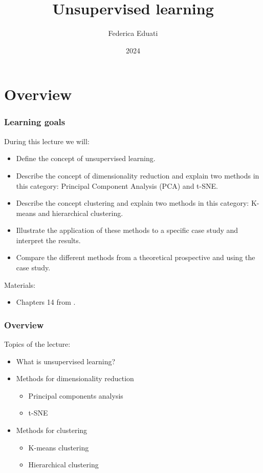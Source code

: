 \documentclass[notes]{beamer}          %
\title{Unsupervised learning}
\author{Federica Eduati}
\institute{Eindhoven University of Technology

Department of Biomedical Engineering}
\date{2024}
\begin{document}
 
\frame{\titlepage}
 
\section{Overview}

\begin{frame}
\frametitle{Learning goals}
During this lecture we will:
\begin{itemize}
    \item Define the concept of unsupervised learning.
    \item Describe the concept of dimensionality reduction and explain two methods in this category: Principal Component Analysis (PCA) and t-SNE.
    \item Describe the concept clustering and explain two methods in this category: K-means and hierarchical clustering.
    \item Illustrate the application of these methods to a specific case study and interpret the results.
    \item Compare the different methods from a theoretical prospective and using the case study.
\end{itemize}

\vspace{5mm} 

Materials: 
\begin{itemize}
    \item Chapters 14 from \cite{elements}.
\end{itemize}

\end{frame}


\begin{frame}
\frametitle{Overview}
Topics of the lecture:
\begin{itemize}
    \item What is unsupervised learning?
    \item Methods for dimensionality reduction
    \begin{itemize}
    		\item Principal components analysis
    		\item t-SNE
    \end{itemize}
    \item Methods for clustering
    \begin{itemize}
    		\item K-means clustering
    		\item Hierarchical clustering
    	\end{itemize}
\end{itemize}

\vspace{5mm} 


\end{frame}
\end{document}
